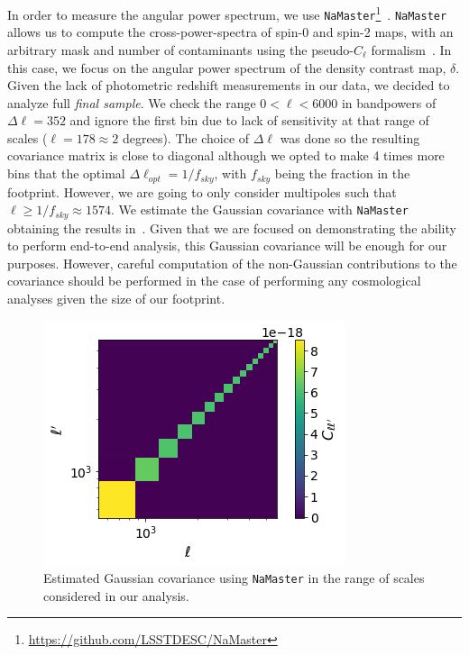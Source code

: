 \documentclass[twocolumn]{aastex62}
\begin{document}
In order to measure the angular power spectrum, we use \texttt{NaMaster}\footnote{\url{https://github.com/LSSTDESC/NaMaster}}~\citep{2019MNRAS.484.4127A}. \texttt{NaMaster} allows us to compute the cross-power-spectra of spin-0 and spin-2 maps, with an arbitrary mask and number of contaminants using the pseudo-$C_{\ell}$ formalism~\citep{1973ApJ...185..413P,2002ApJ...567....2H,2017MNRAS.465.1847E}. In this case, we focus on the angular power spectrum of the density contrast map, $\delta$. Given the lack of photometric redshift measurements in our data, we decided to analyze full \textit{final sample}. We check the range $0 < \ell < 6000$ in bandpowers of $\Delta \ell = 352$ and ignore the first bin due to lack of sensitivity at that range of scales ($\ell=178 \approx 2$ degrees). The choice of $\Delta \ell$ was done so the resulting covariance matrix is close to diagonal although we opted to make 4 times more bins that the optimal $\Delta \ell_{opt} = 1/f_{sky}$, with $f_{sky}$ being the fraction in the footprint. However, we are going to only consider multipoles such that $\ell \geq 1/f_{sky} \approx 1574$. We estimate the Gaussian covariance with \texttt{NaMaster} obtaining the results in~. Given that we are focused on demonstrating the ability to perform end-to-end analysis, this Gaussian covariance will be enough for our purposes. However, careful computation of the non-Gaussian contributions to the covariance should be performed in the case of performing any cosmological analyses given the size of our footprint.

\begin{figure}
\centering
\includegraphics[width=0.9\columnwidth]{Gaussian_covariance}
\caption{Estimated Gaussian covariance using \texttt{NaMaster} in the range of scales considered in our analysis.}
\label{fig:gaussian_cov}
\end{figure}
\end{document}
